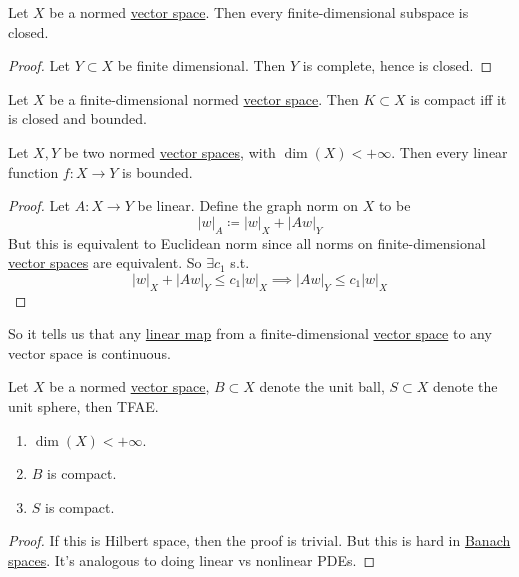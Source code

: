   \begin{corollary}[1.2.7]
    \label{thm:1-2-7}
    Let $X$ be a normed \hyperref[lin-def:vector-space]{vector space}. Then every finite-dimensional subspace is closed. 
  \end{corollary}
  \begin{proof}
    Let $Y \subset X$ be finite dimensional. Then $Y$ is complete, hence is closed. 
  \end{proof}

  \begin{corollary}
    \label{thm:heine-borel-in-finite-dimensional-normed-spaces}
    Let $X$ be a finite-dimensional normed \hyperref[lin-def:vector-space]{vector space}. Then $K \subset X$ is compact iff it is closed and bounded. 
  \end{corollary}

  \begin{corollary}[1.2.9]
    \label{thm:1-2-9}
    Let $X, Y$ be two normed \hyperref[lin-def:vector-space]{vector spaces}, with $\dim(X) < +\infty$. Then every linear function $f: X \to Y$ is bounded. 
  \end{corollary}
  \begin{proof}
    Let $A: X \to Y$ be linear. Define the graph norm on $X$ to be 
    \begin{equation}
      |w|_A \coloneqq |w|_X + |Aw|_Y
    \end{equation}
    But this is equivalent to Euclidean norm since all norms on finite-dimensional \hyperref[lin-def:vector-space]{vector spaces} are equivalent. So $\exists c_1$ s.t. 
    \begin{equation}
      |w|_X + |Aw|_Y \leq c_1 |w|_X \implies |Aw|_Y \leq c_1 |w|_X
    \end{equation}
  \end{proof}

  So it tells us that any \hyperref[lin-def:linear_map]{linear map} from a finite-dimensional \hyperref[lin-def:vector-space]{vector space} to any vector space is continuous. 

  \begin{theorem}[1.2.11]
    \label{thm:1-2-11}
    Let $X$ be a normed \hyperref[lin-def:vector-space]{vector space}, $B \subset X$ denote the unit ball, $S \subset X$ denote the unit sphere, then TFAE. 
    \begin{enumerate}
      \item $\dim(X) < +\infty$. 
      \item $B$ is compact. 
      \item $S$ is compact. 
    \end{enumerate}
  \end{theorem}
	\begin{proof}
		If this is Hilbert space, then the proof is trivial. But this is hard in \hyperref[mv-def:banach-space]{Banach spaces}. It's analogous to doing linear vs nonlinear PDEs. 
	\end{proof}


